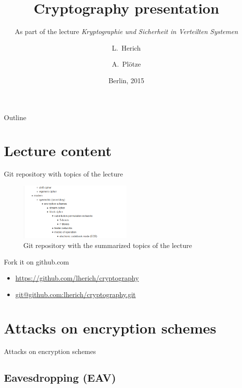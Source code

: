 \documentclass[ucs,9pt]{beamer}
\title{Cryptography presentation}
\subtitle{As part of the lecture \textit{Kryptographie und Sicherheit in Verteilten Systemen}}
\author{L.~Herich \and A.~Plötze}
\institute[FU Berlin]{Freie Universität Berlin}
\date{Berlin, 2015}
\begin{document}
\begin{frame}[plain]
  \titlepage
\end{frame}

\begin{frame}{Outline}
  \tableofcontents
\end{frame}


\section{Lecture content}

\begin{frame}{Git repository with topics of the lecture}
    \begin{figure}[h]
        \centering
        \includegraphics[width=0.5\textwidth]{figures/list_of_content.png}
        \caption{Git repository with the summarized topics of the lecture}
    \end{figure}
    \begin{block}{Fork it on github.com}
        \begin{itemize}
            \item 
            \url{https://github.com/lherich/cryptography}
            \item
            \url{git@github.com:lherich/cryptography.git}
        \end{itemize}
    \end{block}
\end{frame}


%
%
\section{Attacks on encryption schemes}
\begin{frame}
    \centering
    \huge{Attacks on encryption schemes}
\end{frame}


\subsection{Eavesdropping (EAV)}
\end{document}
